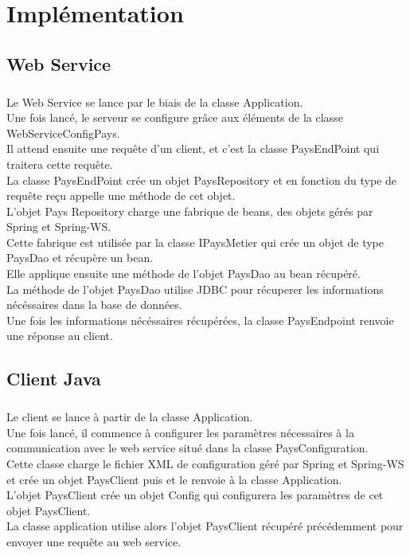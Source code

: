 \chapter{Implémentation}
\section{Web Service}
\paragraph{}Le Web Service se lance par le biais de la classe Application.\\
Une fois lancé, le serveur se configure grâce aux éléments de la classe WebServiceConfigPays.\\
Il attend ensuite une requête d'un client, et c'est la classe PaysEndPoint qui traitera cette requête.\\
La classe PaysEndPoint crée un objet PaysRepository et en fonction du type de requête reçu appelle une méthode de cet objet.\\
L'objet Pays Repository charge une fabrique de beans, des objets gérés par Spring et Spring-WS.\\
Cette fabrique est utilisée par la classe IPaysMetier qui crée un objet de type PaysDao et récupère un bean.\\
Elle applique ensuite une méthode de l'objet PaysDao au bean récupéré.\\
La méthode de l'objet PaysDao utilise JDBC pour récuperer les informations nécéssaires dans la base de données.\\
Une fois les informations nécéssaires récupérées, la classe PaysEndpoint renvoie une réponse au client.\\

\section{Client Java}
\paragraph{} Le client se lance à partir de la classe Application.\\
Une fois lancé, il commence à configurer les paramètres nécessaires à la communication avec le web service situé dans la classe PaysConfiguration.\\
Cette classe charge le fichier XML de configuration géré par Spring et Spring-WS et crée un objet PaysClient puis et le renvoie à la classe Application.\\
L'objet PaysClient crée un objet Config qui configurera les paramètres de cet objet PaysClient.\\
La classe application utilise alors l'objet PaysClient récupéré précédemment pour envoyer une requête au web service.\\

